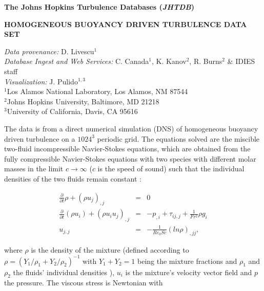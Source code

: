 \documentclass[11pt]{article}
\newcommand\p{\ensuremath{\partial}}
\newcommand\pdt{\ensuremath{\frac{\p}{\p t}}}
\begin{document}
\begin{center}
\Large
{\color{blue}\bf The Johns Hopkins Turbulence Databases ({\em JHTDB})}
\end{center}

\normalsize

\begin{center}
\bf HOMOGENEOUS BUOYANCY DRIVEN TURBULENCE DATA SET
\end{center}

\vskip 0.2in


\begin{center}
{\em Data provenance:} D. Livescu$^1$ \\
{\em Database Ingest and Web Services:} C. Canada$^1$, K. Kanov$^2$, 
R. Burns$^2$ \& IDIES staff\\
{\em Visualization:} J. Pulido$^{1,3}$\\
$^1$Los Alamos National Laboratory, Los Alamos, NM 87544\\
$^2$Johns Hopkins University, Baltimore, MD 21218\\
$^3$University of California, Davis, CA 95616\\
\end{center}

\vskip 0.2in

The data is from a direct numerical simulation (DNS) of homogeneous buoyancy 
driven turbulence on a $1024^3$ periodic grid. The equations solved are the 
miscible two-fluid incompressible Navier-Stokes equations, which are obtained 
from the fully compressible Navier-Stokes equations with two species with 
different molar masses in the limit $c \rightarrow \infty$ ($c$ is the speed of
sound) such that the individual densities of the two fluids remain constant 
\cite{LR07,LR08,Livescu13}:

\begin{eqnarray}
\label{eq.01}
\pdt \rho + (\rho u_j)_{,j} &=& 0
\\
\label{eq.02}
\pdt (\rho u_i) + (\rho u_i u_j)_{,j} &=& -p_{,i}+\tau_ {ij,j}+
\frac{1}{Fr^2}\rho g_i
\\
\label{eq.div}
u_{j,j}  &=&  - \frac{1}{Re_0 Sc} (ln \rho)_{,jj},
\end{eqnarray}

\noindent
where $\rho$ is the density of the mixture (defined according to
$\rho = (Y_1/\rho_1+Y_2/\rho_2)^{-1}$ with $Y_1+Y_2=1$ being the mixture 
fractions and $\rho_1$ and $\rho_2$ the fluids' individual densities 
\cite{LR07}), $u_i$ is the mixture's velocity vector field and $p$ the 
pressure. The viscous stress is Newtonian with
\end{document}
